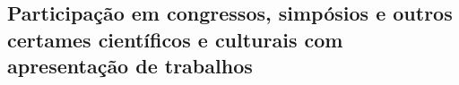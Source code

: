 \documentclass[a4paper,oneside,10pt]{article}
\newcounter{document}%
\begin{document}


\subsection{\large{Participação  em  congressos,  simpósios  e  outros  certames  científicos  e  culturais  com apresentação  de  trabalhos}}
\vspace{0.3cm}
\end{document}
